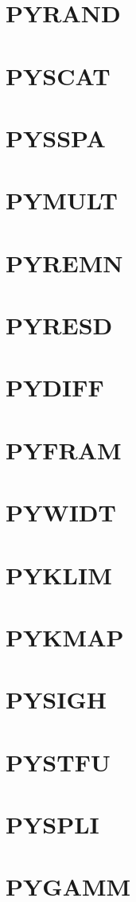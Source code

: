 \documentclass[10pt,UTF8]{ctexbook}
\begin{document}
\section{PYRAND}
\section{PYSCAT}
\section{PYSSPA}
\section{PYMULT}
\section{PYREMN}
\section{PYRESD}
\section{PYDIFF}
\section{PYFRAM}
\section{PYWIDT}
\section{PYKLIM}
\section{PYKMAP}
\section{PYSIGH}
\section{PYSTFU}
\section{PYSPLI}
\section{PYGAMM}
\end{document}
